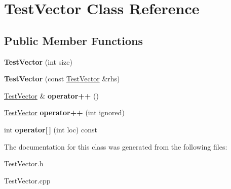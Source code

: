 \hypertarget{class_test_vector}{\section{Test\+Vector Class Reference}
\label{class_test_vector}
}
\subsection*{Public Member Functions}
\begin{DoxyCompactItemize}
\item 
\hypertarget{class_test_vector_abf540180761043bb7ac2665e147bdd33}{{\bfseries Test\+Vector} (int size)}\label{class_test_vector_abf540180761043bb7ac2665e147bdd33}

\item 
\hypertarget{class_test_vector_a4a48046f67cc822ce9a6907f022a5d61}{{\bfseries Test\+Vector} (const \hyperlink{class_test_vector}{Test\+Vector} \&rhs)}\label{class_test_vector_a4a48046f67cc822ce9a6907f022a5d61}

\item 
\hypertarget{class_test_vector_a8d4a95de7e0e9985ffcd86280efb631d}{\hyperlink{class_test_vector}{Test\+Vector} \& {\bfseries operator++} ()}\label{class_test_vector_a8d4a95de7e0e9985ffcd86280efb631d}

\item 
\hypertarget{class_test_vector_a1b9640623055cd4618606cd2f0ed08b3}{\hyperlink{class_test_vector}{Test\+Vector} {\bfseries operator++} (int ignored)}\label{class_test_vector_a1b9640623055cd4618606cd2f0ed08b3}

\item 
\hypertarget{class_test_vector_ae244371b88cb0ab127a877e5206b7ed8}{int {\bfseries operator\mbox{[}$\,$\mbox{]}} (int loc) const }\label{class_test_vector_ae244371b88cb0ab127a877e5206b7ed8}

\end{DoxyCompactItemize}


The documentation for this class was generated from the following files\+:\begin{DoxyCompactItemize}
\item 
Test\+Vector.\+h\item 
Test\+Vector.\+cpp\end{DoxyCompactItemize}
